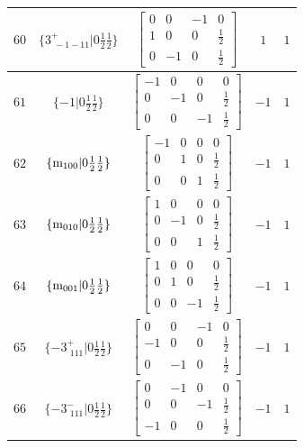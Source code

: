 \documentclass[fleqn,8pt]{jsarticle}
\begin{document}
\begin{longtable}{ccccc}
$ 60 $ & $ \{3^{+}_{\,\,-1-11}|0 \frac{1}{2} \frac{1}{2}\} $ & $ \begin{bmatrix} 0 & 0 & -1 & 0 \\ 1 & 0 & 0 & \frac{1}{2} \\ 0 & -1 & 0 & \frac{1}{2} \end{bmatrix} $ & $ 1 $ & $ 1 $ \\ \hline
$ 61 $ & $ \{-1|0 \frac{1}{2} \frac{1}{2}\} $ & $ \begin{bmatrix} -1 & 0 & 0 & 0 \\ 0 & -1 & 0 & \frac{1}{2} \\ 0 & 0 & -1 & \frac{1}{2} \end{bmatrix} $ & $ -1 $ & $ 1 $ \\ \hline
$ 62 $ & $ \{{\rm m}_{100}|0 \frac{1}{2} \frac{1}{2}\} $ & $ \begin{bmatrix} -1 & 0 & 0 & 0 \\ 0 & 1 & 0 & \frac{1}{2} \\ 0 & 0 & 1 & \frac{1}{2} \end{bmatrix} $ & $ -1 $ & $ 1 $ \\ \hline
$ 63 $ & $ \{{\rm m}_{010}|0 \frac{1}{2} \frac{1}{2}\} $ & $ \begin{bmatrix} 1 & 0 & 0 & 0 \\ 0 & -1 & 0 & \frac{1}{2} \\ 0 & 0 & 1 & \frac{1}{2} \end{bmatrix} $ & $ -1 $ & $ 1 $ \\ \hline
$ 64 $ & $ \{{\rm m}_{001}|0 \frac{1}{2} \frac{1}{2}\} $ & $ \begin{bmatrix} 1 & 0 & 0 & 0 \\ 0 & 1 & 0 & \frac{1}{2} \\ 0 & 0 & -1 & \frac{1}{2} \end{bmatrix} $ & $ -1 $ & $ 1 $ \\ \hline
$ 65 $ & $ \{-3^{+}_{\,\,111}|0 \frac{1}{2} \frac{1}{2}\} $ & $ \begin{bmatrix} 0 & 0 & -1 & 0 \\ -1 & 0 & 0 & \frac{1}{2} \\ 0 & -1 & 0 & \frac{1}{2} \end{bmatrix} $ & $ -1 $ & $ 1 $ \\ \hline
$ 66 $ & $ \{-3^{-}_{\,\,111}|0 \frac{1}{2} \frac{1}{2}\} $ & $ \begin{bmatrix} 0 & -1 & 0 & 0 \\ 0 & 0 & -1 & \frac{1}{2} \\ -1 & 0 & 0 & \frac{1}{2} \end{bmatrix} $ & $ -1 $ & $ 1 $ \\ \hline

\end{longtable}
\end{document}
